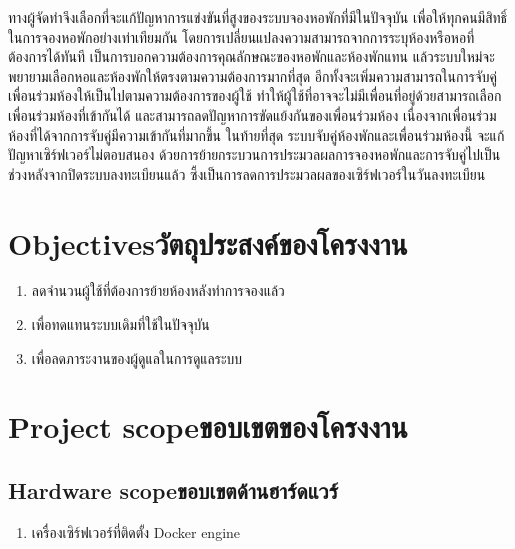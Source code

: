 ทางผู้จัดทำจึงเลือกที่จะแก้ปัญหาการแข่งขันที่สูงของระบบจองหอพักที่มีในปัจจุบัน เพื่อให้ทุกคนมีสิทธิ์ในการจองหอพักอย่างเท่าเทียมกัน
โดยการเปลี่ยนแปลงความสามารถจากการระบุห้องหรือหอที่ต้องการได้ทันที เป็นการบอกความต้องการคุณลักษณะของหอพักและห้องพักแทน
แล้วระบบใหม่จะพยายามเลือกหอและห้องพักให้ตรงตามความต้องการมากที่สุด อีกทั้งจะเพิ่มความสามารถในการจับคู่เพื่อนร่วมห้องให้เป็นไปตามความต้องการของผู้ใช้ ทำให้ผู้ใช้ที่อาจจะไม่มีเพื่อนที่อยู่ด้วยสามารถเลือกเพื่อนร่วมห้องที่เข้ากันได้
และสามารถลดปัญหาการขัดแย้งกันของเพื่อนร่วมห้อง เนื่องจากเพื่อนร่วมห้องที่ได้จากการจับคู่มีความเข้ากันที่มากขึ้น
ในท้ายที่สุด ระบบจับคู่ห้องพักและเพื่อนร่วมห้องนี้ จะแก้ปัญหาเซิร์ฟเวอร์ไม่ตอบสนอง ด้วยการย้ายกระบวนการประมวลผลการจองหอพักและการจับคู่ไปเป็นช่วงหลังจากปิดระบบลงทะเบียนแล้ว
ซึ้งเป็นการลดการประมวลผลของเซิร์ฟเวอร์ในวันลงทะเบียน

\section{\ifenglish Objectives\else วัตถุประสงค์ของโครงงาน\fi}
\begin{enumerate}
    \item ลดจำนวนผู้ใช้ที่ต้องการย้ายห้องหลังทำการจองแล้ว
    \item เพื่อทดแทนระบบเดิมที่ใช้ในปัจจุบัน
    \item เพื่อลดภาระงานของผู้ดูแลในการดูแลระบบ
\end{enumerate}

\section{\ifenglish Project scope\else ขอบเขตของโครงงาน\fi}
\subsection{\ifenglish Hardware scope\else ขอบเขตด้านฮาร์ดแวร์\fi}
\begin{enumerate}
    \item เครื่องเซิร์ฟเวอร์ที่ติดตั้ง Docker engine
\end{enumerate}
